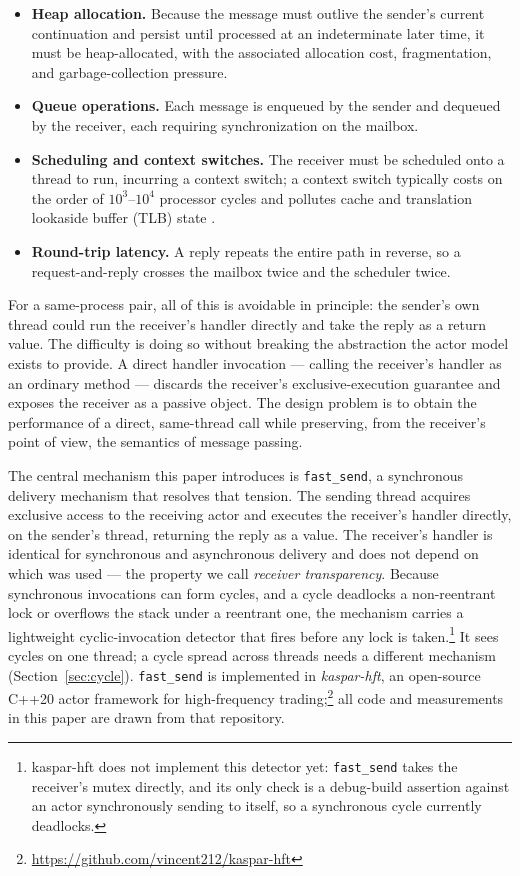 \documentclass[11pt]{article}
\newcommand{\fs}{\texttt{fast\_send}}
\begin{document}
\begin{itemize}[leftmargin=1.4em]
  \item \textbf{Heap allocation.} Because the message must outlive the sender's
  current continuation and persist until processed at an indeterminate later
  time, it must be heap-allocated, with the associated allocation cost,
  fragmentation, and garbage-collection pressure.
  \item \textbf{Queue operations.} Each message is enqueued by the sender and
  dequeued by the receiver, each requiring synchronization on the mailbox.
  \item \textbf{Scheduling and context switches.} The receiver must be scheduled
  onto a thread to run, incurring a context switch; a context switch typically
  costs on the order of $10^3$--$10^4$ processor cycles and pollutes cache and
  translation lookaside buffer (TLB) state \cite{li2007,mcvoy1996,bendersky2018}.
  \item \textbf{Round-trip latency.} A reply repeats the entire path in reverse,
  so a request-and-reply crosses the mailbox twice and the scheduler twice.
\end{itemize}

For a same-process pair, all of this is avoidable in principle: the sender's own
thread could run the receiver's handler directly and take the reply as a return
value. The difficulty is doing so without breaking the abstraction the actor
model exists to provide. A direct handler invocation --- calling the receiver's
handler as an ordinary method --- discards the receiver's exclusive-execution
guarantee and exposes the receiver as a passive object.
The design problem is to obtain the
performance of a direct, same-thread call while preserving, from the receiver's
point of view, the semantics of message passing.

The central mechanism this paper introduces is \fs{}, a synchronous delivery
mechanism that resolves that
tension. The sending thread acquires exclusive access to the receiving actor and
executes the receiver's handler directly, on the sender's thread, returning the
reply as a value. The receiver's handler is identical for synchronous and
asynchronous delivery and does not depend on which was used --- the property we
call \emph{receiver transparency}. Because synchronous invocations can form
cycles, and a cycle deadlocks a non-reentrant lock or overflows the stack under
a reentrant one, the mechanism carries a lightweight cyclic-invocation detector
that fires before any lock is taken.\footnote{kaspar-hft does not implement this
detector yet: \fs{} takes the receiver's mutex directly, and its only check is a
debug-build assertion against an actor synchronously sending to itself, so a
synchronous cycle currently deadlocks.} It sees cycles on one thread; a cycle
spread across threads needs a different mechanism (Section~\ref{sec:cycle}).
\fs{} is implemented in \emph{kaspar-hft}, an
open-source C++20 actor framework for high-frequency
trading;\footnote{\url{https://github.com/vincent212/kaspar-hft}} all code and
measurements in this paper are drawn from that repository.
\end{document}
